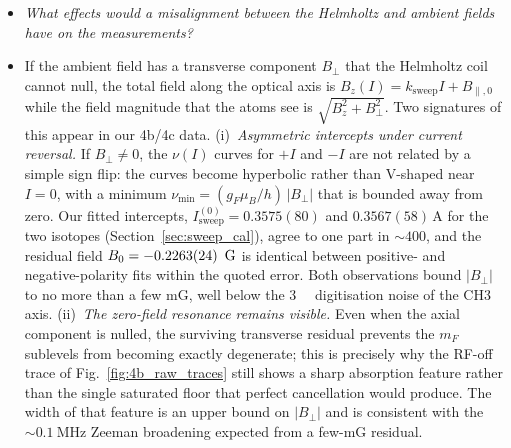 \begin{itemize}
    \item[Q17.] \emph{What effects would a misalignment between the Helmholtz and ambient fields have on the measurements?}
    \item[A17.] If the ambient field has a transverse component $B_\perp$ that the Helmholtz coil cannot null, the total field along the optical axis is $B_z(I) = k_{\mathrm{sweep}}I + B_{\parallel,0}$ while the field magnitude that the atoms see is $\sqrt{B_z^2 + B_\perp^2}$. Two signatures of this appear in our 4b/4c data. (i)~\emph{Asymmetric intercepts under current reversal.} If $B_\perp \neq 0$, the $\nu(I)$ curves for $+I$ and $-I$ are not related by a simple sign flip: the curves become hyperbolic rather than V-shaped near $I = 0$, with a minimum $\nu_{\min} = (g_F \mu_B / h)\,|B_\perp|$ that is bounded away from zero. Our fitted intercepts, $I_{\mathrm{sweep}}^{(0)} = 0.3575(80)$ and $0.3567(58)$\,A for the two isotopes (Section~\ref{sec:sweep_cal}), agree to one part in $\sim 400$, and the residual field $B_0 = -0.2263(24)\,\si{\gauss}$ is identical between positive- and negative-polarity fits within the quoted error. Both observations bound $|B_\perp|$ to no more than a few mG, well below the \SI{3}{\milli\gauss} digitisation noise of the CH3 axis. (ii)~\emph{The zero-field resonance remains visible.} Even when the axial component is nulled, the surviving transverse residual prevents the $m_F$ sublevels from becoming exactly degenerate; this is precisely why the RF-off trace of Fig.~\ref{fig:4b_raw_traces} still shows a sharp absorption feature rather than the single saturated floor that perfect cancellation would produce. The width of that feature is an upper bound on $|B_\perp|$ and is consistent with the $\sim\SI{0.1}{\mega\hertz}$ Zeeman broadening expected from a few-mG residual.
\end{itemize}